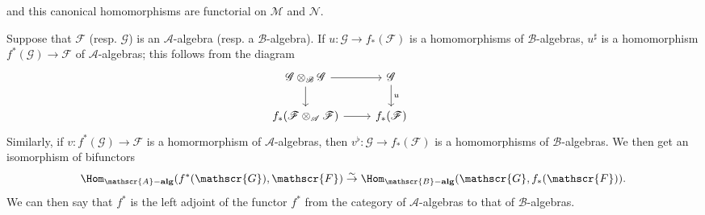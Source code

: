 and this canonical homomorphisms are functorial on $\mathscr{M}$ and $\mathscr{N}$.\par
Suppose that $\mathscr{F}$ (resp. $\mathscr{G}$) is an $\mathscr{A}$-algebra (resp. a $\mathscr{B}$-algebra). If $u:\mathscr{G}\to f_*(\mathscr{F})$ is a homomorphisms of $\mathscr{B}$-algebras, $u^{\sharp}$  is a homomorphism $f^*(\mathscr{G})\to\mathscr{F}$ of $\mathscr{A}$-algebras; this follows from the diagram
\[\begin{tikzcd}
\mathscr{G}\otimes_{\mathscr{B}}\mathscr{G}\ar[r]\ar[d]&\mathscr{G}\ar[d,"u"]&\\
f_*(\mathscr{F}\otimes_{\mathscr{A}}\mathscr{F})\ar[r]&f_*(\mathscr{F})
\end{tikzcd}\]
Similarly, if $v:f^*(\mathscr{G})\to\mathscr{F}$ is a homormorphism of $\mathscr{A}$-algebras, then $v^\flat:\mathscr{G}\to f_*(\mathscr{F})$ is a homomorphisms of $\mathscr{B}$-algebras. We then get an isomorphism of bifunctors
\[\Hom_{\mathscr{A}-\mathbf{alg}}(f^*(\mathscr{G}),\mathscr{F})\stackrel{\sim}{\to}\Hom_{\mathscr{B}-\mathbf{alg}}(\mathscr{G},f_*(\mathscr{F})).\]
We can then say that $f^*$ is the left adjoint of the functor $f^*$ from the category of $\mathscr{A}$-algebras to that of $\mathscr{B}$-algebras.
